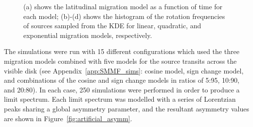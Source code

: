 \begin{figure}[!ht]
	\qquad
	
	\caption{(a) shows the latitudinal migration model as a function of time for each model; (b)-(d) shows the histogram of the rotation frequencies of sources sampled from the KDE for linear, quadratic, and exponential migration models, respectively.}
	\label{fig:artificial_sim_lats}
\end{figure}

The simulations were run with 15 different configurations which used the three migration models combined with five models for the source transits across the visible disk (see Appendix~\ref{app:SMMF_sims}: cosine model, sign change model, and combinations of the cosine and sign change models in ratios of 5:95, 10:90, and 20:80). In each case, 250 simulations were performed in order to produce a limit spectrum. Each limit spectrum was modelled with a series of Lorentzian peaks sharing a global asymmetry parameter, and the resultant asymmetry values are shown in Figure~\ref{fig:artificial_asymm}.

